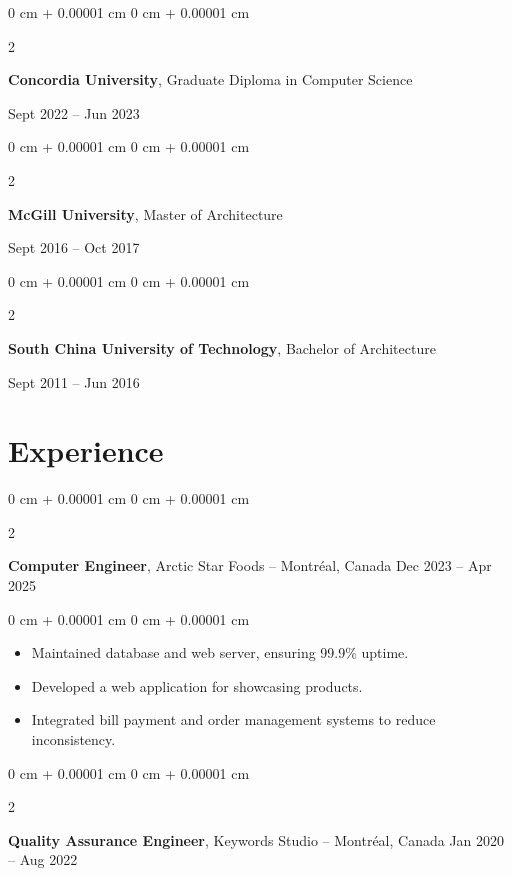 \documentclass[10pt, letterpaper]{article}
\newenvironment{highlights}{
    \begin{itemize}[
        topsep=0.10 cm,
        parsep=0.10 cm,
        partopsep=0pt,
        itemsep=0pt,
        leftmargin=0 cm + 10pt
    ]
}{
    \end{itemize}
} %
\newenvironment{onecolentry}{
    \begin{adjustwidth}{
        0 cm + 0.00001 cm
    }{
        0 cm + 0.00001 cm
    }
}{
    \end{adjustwidth}
} %
\newenvironment{twocolentry}[2][]{
    \onecolentry
    \def\secondColumn{#2}
    \setcolumnwidth{\fill, 6.5 cm}
    \begin{paracol}{2}
}{
    \switchcolumn \raggedleft \secondColumn
    \end{paracol}
    \endonecolentry
} %
\begin{document}
        \begin{twocolentry}{
            Sept 2022 – Jun 2023
        }
            \textbf{Concordia University}, Graduate Diploma in Computer Science
        \end{twocolentry}

        \begin{twocolentry}{
            Sept 2016 – Oct 2017
        }
            \textbf{McGill University}, Master of Architecture
        \end{twocolentry}

        \begin{twocolentry}{
            Sept 2011 – Jun 2016
        }
            \textbf{South China University of Technology}, Bachelor of Architecture
        \end{twocolentry}


    \section{Experience}

        \begin{twocolentry}{
            Dec 2023 – Apr 2025
        }
            \textbf{Computer Engineer}, Arctic Star Foods -- Montréal, Canada\end{twocolentry}

        \vspace{0.10 cm}
        \begin{onecolentry}
            \begin{highlights}
                \item Maintained database and web server, ensuring 99.9\% uptime.
                \item Developed a web application for showcasing products.
                \item Integrated bill payment and order management systems to reduce inconsistency.
            \end{highlights}
        \end{onecolentry}


        \vspace{0.2 cm}

        \begin{twocolentry}{
            Jan 2020 – Aug 2022
        }
            \textbf{Quality Assurance Engineer}, Keywords Studio -- Montréal, Canada\end{twocolentry}
\end{document}
